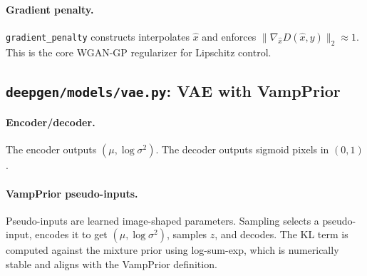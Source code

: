 \paragraph{Gradient penalty.}
\texttt{gradient\_penalty} constructs interpolates $\hat{x}$ and enforces $\|\nabla_{\hat{x}}D(\hat{x},y)\|_2\approx 1$. This is the core WGAN-GP regularizer for Lipschitz control.

\subsection{\texttt{deepgen/models/vae.py}: VAE with VampPrior}
\paragraph{Encoder/decoder.}
The encoder outputs $(\mu,\log\sigma^2)$. The decoder outputs sigmoid pixels in $(0,1)$.

\paragraph{VampPrior pseudo-inputs.}
Pseudo-inputs are learned image-shaped parameters. Sampling selects a pseudo-input, encodes it to get $(\mu,\log\sigma^2)$, samples $z$, and decodes. The KL term is computed against the mixture prior using log-sum-exp, which is numerically stable and aligns with the VampPrior definition.

